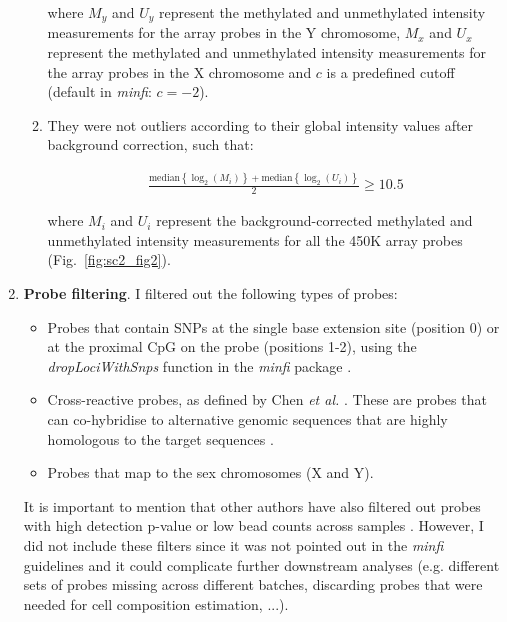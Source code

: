 \begin{enumerate}
\begin{enumerate}
			where $M_{y}$ and $U_{y}$ represent the methylated and unmethylated intensity measurements for the array probes in the Y chromosome, $M_{x}$ and $U_{x}$ represent the methylated and unmethylated intensity measurements for the array probes in the X chromosome and $c$ is a predefined cutoff (default in \textit{minfi}: $c=-2$).
			
			\smallskip
			
			\item They were not outliers according to their global intensity values after background correction, such that:
			
			\begin{align}
			\frac{\mathrm{median}\left\{\log_2(M_{i})\right\} + \mathrm{median}\left\{\log_2(U_{i})\right\}}{2} \geq 10.5
			\end{align}
			
			where $M_{i}$ and $U_{i}$ represent the background-corrected methylated and unmethylated intensity measurements for all the 450K array probes (Fig.~\ref{fig:sc2_fig2}).
			
		\end{enumerate} 
	
	\item \textbf{Probe filtering}. I filtered out the following types of probes:
	
	\begin{itemize}
		
		\item Probes that contain \acrshort{SNP}s at the single base extension site (position 0) or at the proximal CpG on the probe (positions 1-2), using the \textit{dropLociWithSnps} function in the \textit{minfi} package \cite{Aryee2014}. 
		
		\item Cross-reactive probes, as defined by Chen \textit{et al.} \cite{Chen2013}. These are probes that can co-hybridise to alternative genomic sequences that are highly homologous to the target sequences \cite{Chen2013}.  
		
		\item  Probes that map to the sex chromosomes (X and Y).
	
	\end{itemize}
	
	It is important to mention that other authors have also filtered out probes with high detection p-value or low bead counts across samples \cite{Wilhelm-Benartzi2013,Morris2015}. However, I did not include these filters since it was not pointed out in the \textit{minfi} guidelines \cite{Aryee2014,Fortin2015} and it could complicate further downstream analyses (e.g. different sets of probes missing across different batches, discarding probes that were needed for cell composition estimation, ...).     
	

\end{enumerate}
